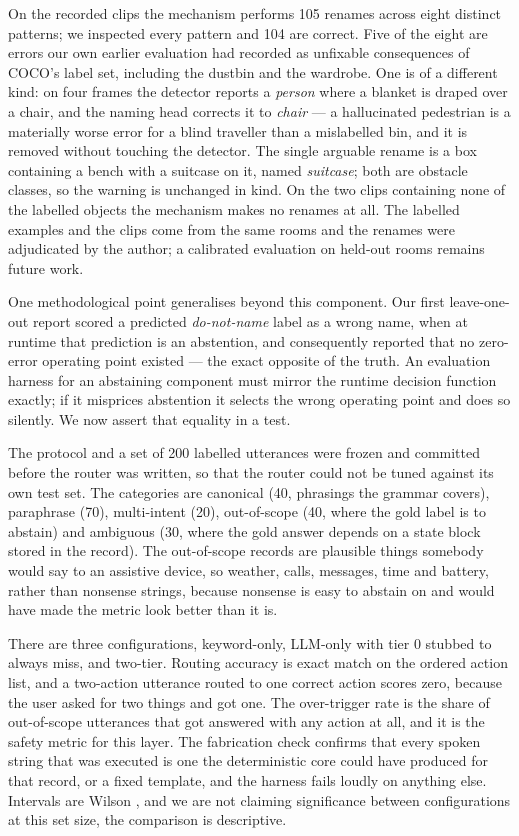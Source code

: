 \documentclass[sigconf,nonacm]{acmart}
\begin{document}
On the recorded clips the mechanism performs 105 renames across eight distinct
patterns; we inspected every pattern and 104 are correct. Five of the eight are
errors our own earlier evaluation had recorded as unfixable consequences of
COCO's label set, including the dustbin and the wardrobe. One is of a different
kind: on four frames the detector reports a \emph{person} where a blanket is
draped over a chair, and the naming head corrects it to \emph{chair} --- a
hallucinated pedestrian is a materially worse error for a blind traveller than a
mislabelled bin, and it is removed without touching the detector. The single
arguable rename is a box containing a bench with a suitcase on it, named
\emph{suitcase}; both are obstacle classes, so the warning is unchanged in kind.
On the two clips containing none of the labelled objects the mechanism makes no
renames at all. The labelled examples and the clips come from the same rooms and
the renames were adjudicated by the author; a calibrated evaluation on held-out
rooms remains future work.

One methodological point generalises beyond this component. Our first
leave-one-out report scored a predicted \emph{do-not-name} label as a wrong name,
when at runtime that prediction is an abstention, and consequently reported that
no zero-error operating point existed --- the exact opposite of the truth. An
evaluation harness for an abstaining component must mirror the runtime decision
function exactly; if it misprices abstention it selects the wrong operating point
and does so silently. We now assert that equality in a test.

The protocol and a set of 200 labelled utterances were frozen and committed
before the router was written, so that the router could not be tuned against its
own test set. The categories are canonical (40, phrasings the grammar covers),
paraphrase (70), multi-intent (20), out-of-scope (40, where the gold label is to
abstain) and ambiguous (30, where the gold answer depends on a state block
stored in the record). The out-of-scope records are plausible things somebody
would say to an assistive device, so weather, calls, messages, time and battery,
rather than nonsense strings, because nonsense is easy to abstain on and would
have made the metric look better than it is.

There are three configurations, keyword-only, LLM-only with tier 0 stubbed to
always miss, and two-tier. Routing accuracy is exact match on the ordered action
list, and a two-action utterance routed to one correct action scores zero,
because the user asked for two things and got one. The over-trigger rate is the
share of out-of-scope utterances that got answered with any action at all, and
it is the safety metric for this layer. The fabrication check confirms that
every spoken string that was executed is one the deterministic core could have
produced for that record, or a fixed template, and the harness fails loudly on
anything else. Intervals are Wilson \cite{wilson1927interval}, and we are not
claiming significance between configurations at this set size, the comparison is
descriptive.
\end{document}
